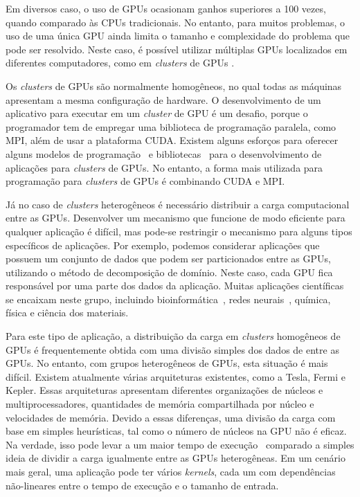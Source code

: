 {Em diversos caso, o uso de GPUs ocasionam ganhos superiores a 100 vezes, quando
comparado às CPUs tradicionais. No entanto, para muitos problemas, o uso de uma
única GPU ainda limita o tamanho e complexidade do problema que pode ser
resolvido. Neste caso, é possível utilizar múltiplas GPUs localizados em
diferentes computadores, como em \textit{clusters} de GPUs \cite{raphael,
  cluster}.

Os \textit{clusters} de GPUs são normalmente homogêneos, no qual todas as
máquinas apresentam a mesma configuração de hardware. O desenvolvimento de um
aplicativo para executar em um \textit{cluster} de GPU é um desafio, porque o
programador tem de empregar uma biblioteca de programação paralela, como MPI,
além de usar a plataforma CUDA. Existem alguns esforços para oferecer alguns
modelos de programação~\cite{appCientificas, wave} e bibliotecas~\cite{snucl,
  Flat} para o desenvolvimento de aplicações para \textit{clusters} de GPUs. No
entanto, a forma mais utilizada para programação para \textit{clusters} de GPUs
é combinando CUDA e MPI.

Já no caso de \textit{clusters} heterogêneos é necessário distribuir a carga
computacional entre as GPUs. Desenvolver um mecanismo que funcione de modo
eficiente para qualquer aplicação é difícil, mas pode-se restringir o mecanismo
para alguns tipos específicos de aplicações. Por exemplo, podemos considerar
aplicações que possuem um conjunto de dados que podem ser particionados entre as
GPUs, utilizando o método de decomposição de domínio. Neste caso, cada GPU fica
responsável por uma parte dos dados da aplicação. Muitas aplicações científicas
se encaixam neste grupo, incluindo bioinformática~\cite{rozante}, redes
neurais~\cite{siang}, química, física e ciência dos materiais. 

Para este tipo de aplicação, a distribuição da carga em \textit{clusters}
homogêneos de GPUs é frequentemente obtida com uma divisão simples dos dados de
entre as GPUs. No entanto, com grupos heterogêneos de GPUs, esta situação é mais
difícil. Existem atualmente várias arquiteturas existentes, como a Tesla, Fermi
e Kepler. Essas arquiteturas apresentam diferentes organizações de núcleos e
multiprocessadores, quantidades de memória compartilhada por núcleo e
velocidades de memória. Devido a essas diferenças, uma divisão da carga com base
em simples heurísticas, tal como o número de núcleos na GPU não é eficaz. Na
verdade, isso pode levar a um maior tempo de execução~\cite{raphael} comparado a
simples ideia de dividir a carga igualmente entre as GPUs heterogêneas. Em um
cenário mais geral, uma aplicação pode ter vários \textit{kernels}, cada um com
dependências não-lineares entre o tempo de execução e o tamanho de entrada.

}
